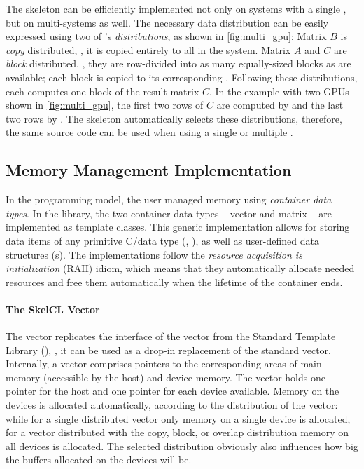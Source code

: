 The \allpairs skeleton can be efficiently implemented not only on systems with a single \GPU, but on multi-\GPU systems as well.
The necessary data distribution can be easily expressed using two of \SkelCL's \emph{distributions}, as shown in \autoref{fig:multi_gpu}:
Matrix $B$ is \emph{copy} distributed, \ie, it is copied entirely to all \GPUs in the system.
Matrix $A$ and $C$ are \emph{block} distributed, \ie, they are row-divided into as many equally-sized blocks as \GPUs are available;
each block is copied to its corresponding \GPU.
Following these distributions, each \GPU computes one block of the result matrix $C$.
In the example with two GPUs shown in \autoref{fig:multi_gpu}, the first two rows of $C$ are computed by  and the last two rows by .
The \allpairs skeleton automatically selects these distributions, therefore, the same source code can be used when using a single \GPU or multiple \GPUs.











\subsection{Memory Management Implementation}
\label{section:skelcl-library:memory-management}
In the \SkelCL programming model, the user managed memory using \emph{container data types}.
In the \SkelCL library, the two container data types -- vector and matrix -- are implemented as template classes.
This generic implementation allows for storing data items of any primitive C/\Cpp data type (\eg, ), as well as user-defined data structures (s).
The implementations follow the \emph{resource acquisition is initialization} (RAII) idiom, which means that they automatically allocate needed resources and free them automatically when the lifetime of the container ends.

\paragraph{The SkelCL Vector}
The \SkelCL vector replicates the interface of the vector from the \Cpp Standard Template Library (\STL), \ie, it can be used as a drop-in replacement of the standard vector.
Internally, a vector comprises pointers to the corresponding areas of main memory (accessible by the host) and device memory.
The vector holds one pointer for the host and one pointer for each device available.
Memory on the devices is allocated automatically, according to the distribution of the vector:
while for a single distributed vector only memory on a single device is allocated, for a vector distributed with the copy, block, or overlap distribution memory on all devices is allocated.
The selected distribution obviously also influences how big the buffers allocated on the devices will be.

